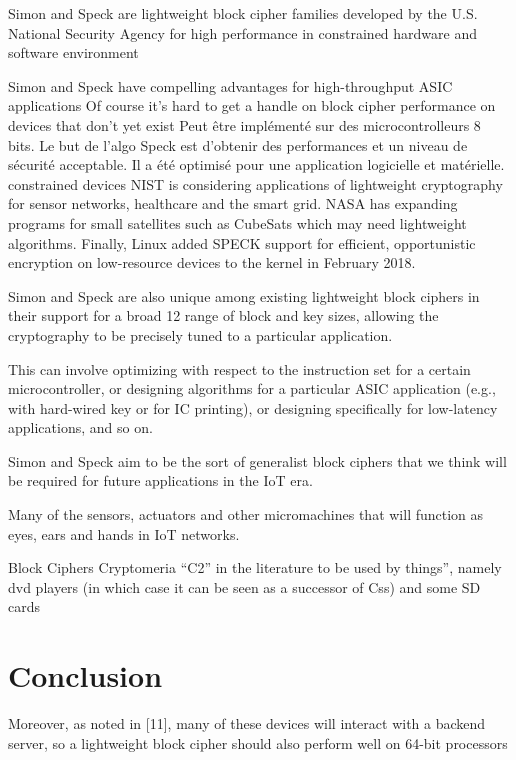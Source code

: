 \documentclass{article}
\begin{document}
Simon and Speck are lightweight block cipher families developed by the U.S. National Security Agency for high performance in constrained hardware and software environment

Simon and Speck have compelling advantages for high-throughput ASIC applications
Of course it’s hard to get a handle on block cipher performance on devices that don’t yet exist
Peut être implémenté sur des microcontrolleurs 8 bits.
Le but de l'algo Speck est d'obtenir des performances et un niveau de sécurité acceptable.
Il a été optimisé pour une application logicielle et matérielle.
constrained devices
NIST is considering applications of lightweight cryptography for sensor networks, healthcare and the smart grid.
NASA has expanding programs for small satellites such as CubeSats which may need lightweight algorithms.
Finally, Linux added SPECK support for efficient, opportunistic encryption on low-resource devices to the kernel in February 2018.

Simon and Speck are also unique among existing lightweight block ciphers in their support for a broad 12 range of block and key sizes, allowing the cryptography to be precisely tuned to a particular application.

This can involve optimizing with respect to the instruction set for a certain microcontroller, or designing algorithms for a particular ASIC application (e.g., with hard-wired key or for IC printing), or designing specifically for low-latency applications, and so on.


Simon and Speck aim to be the sort of generalist block ciphers that we think will be required for future applications in the IoT era.

Many of the sensors, actuators and other micromachines that will function as eyes, ears and hands in IoT networks.


Block Ciphers
Cryptomeria “C2” in the literature to be used by things”,
namely dvd players (in which case it can be seen as a successor of Css) and some SD cards

\section{Conclusion}
Moreover, as noted in [11], many of these devices will interact with a backend server, so a lightweight block cipher should also perform well on 64-bit processors
\end{document}
